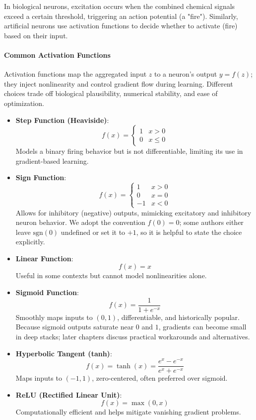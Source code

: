 In biological neurons, excitation occurs when the combined chemical signals exceed a certain threshold, triggering an action potential (a "fire"). Similarly, artificial neurons use activation functions to decide whether to activate (fire) based on their input.

\paragraph{Common Activation Functions}
Activation functions map the aggregated input \(z\) to a neuron's output \(y=f(z)\); they inject nonlinearity and control gradient flow during learning. Different choices trade off biological plausibility, numerical stability, and ease of optimization.

\begin{itemize}
    \item \textbf{Step Function (Heaviside)}:
    \[
        f(x) = \begin{cases}
            1 & x > 0 \\
            0 & x \leq 0
        \end{cases}
    \]
    Models a binary firing behavior but is not differentiable, limiting its use in gradient-based learning.

    \item \textbf{Sign Function}:
    \[
        f(x) = \begin{cases}
            1 & x > 0 \\
            0 & x = 0 \\
            -1 & x < 0
        \end{cases}
    \]
        Allows for inhibitory (negative) outputs, mimicking excitatory and inhibitory neuron behavior. We adopt the convention \(f(0)=0\); some authors either leave \(\mathrm{sgn}(0)\) undefined or set it to \(+1\), so it is helpful to state the choice explicitly.

    \item \textbf{Linear Function}:
    \[
        f(x) = x
    \]
    Useful in some contexts but cannot model nonlinearities alone.

    \item \textbf{Sigmoid Function}:
    \[
        f(x) = \frac{1}{1 + e^{-x}}
    \]
        Smoothly maps inputs to \((0,1)\), differentiable, and historically popular. Because sigmoid outputs saturate near \(0\) and \(1\), gradients can become small in deep stacks; later chapters discuss practical workarounds and alternatives.

    \item \textbf{Hyperbolic Tangent (tanh)}:
    \[
        f(x) = \tanh(x) = \frac{e^{x} - e^{-x}}{e^{x} + e^{-x}}
    \]
    Maps inputs to \((-1,1)\), zero-centered, often preferred over sigmoid.

    \item \textbf{ReLU (Rectified Linear Unit)}:
    \[
        f(x) = \max(0, x)
    \]
        Computationally efficient and helps mitigate vanishing gradient problems.

\end{itemize}

